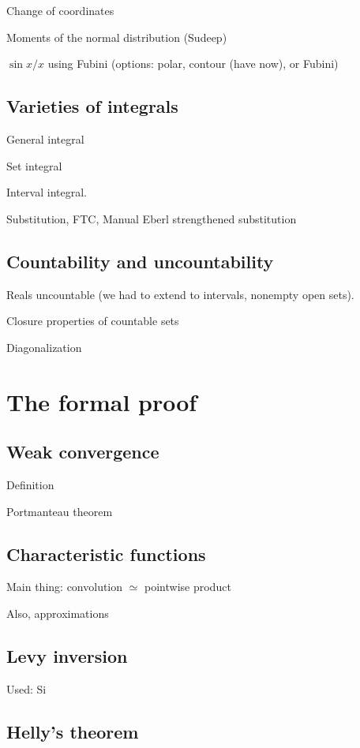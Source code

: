 \documentclass{svjour3}
\begin{document}
Change of coordinates

Moments of the normal distribution (Sudeep)

$\sin x / x$ using Fubini (options: polar, contour (have now), or Fubini)

\subsection{Varieties of integrals}

General integral

Set integral

Interval integral.

Substitution, FTC, Manual Eberl strengthened substitution

\subsection{Countability and uncountability}

Reals uncountable (we had to extend to intervals, nonempty open sets).

Closure properties of countable sets

Diagonalization 


\section{The formal proof}
\label{section:formal}

\subsection{Weak convergence}

Definition

Portmanteau theorem

\subsection{Characteristic functions}

Main thing: convolution $\simeq$ pointwise product

Also, approximations

\subsection{Levy inversion}

Used: Si

\subsection{Helly's theorem}
\end{document}
